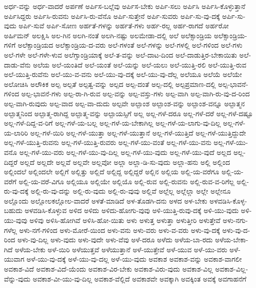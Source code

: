 {ಅರ್ಧ-ವನ್ನು
ಅರ್ಧ-ವಾದರೆ
ಅರ್ಪಣೆ
ಅರ್ಪಿಸ-ಬಲ್ಲೆವು
ಅರ್ಪಿಸ-ಬೇಕು
ಅರ್ಪಿ-ಸಲು
ಅರ್ಪಿಸಿ
ಅರ್ಪಿಸಿ-ಕೊಳ್ಳುತ್ತಾನೆ
ಅರ್ಪಿಸಿದ್ದರು
ಅರ್ಪಿಸಿ-ರುವನು
ಅರ್ಪಿಸಿ-ರು-ವೆನೊ
ಅರ್ಪಿ-ಸುತ್ತೇನೆ
ಅರ್ಪಿ-ಸುವರು
ಅರ್ಪಿ-ಸು-ವು-ದಕ್ಕೆ
ಅರ್ಪಿ-ಸು-ವುದು
ಅರ್ಪಿ-ಸುವೆ
ಅರ್ಪಿ-ಸೋಣ
ಅರ್ಹತೆ-ಗಳನ್ನು
ಅರ್ಹತೆ-ಗಳು
ಅರ್ಹ-ರಲ್ಲ
ಅರ್ಹ-ರಾಗದೆ
ಅರ್ಹರೋ
ಅರ್ಹಿಮನ್
ಅಲಕ್ಷಿಸಿ
ಅಲ-ಗಿನ
ಅಲಗಿ-ನಂತೆ
ಅಲಗಿ-ನಷ್ಟು
ಅಲಮೇಡಾ-ದಲ್ಲಿ
ಅಲೆ
ಅಲೆಕ್ಸಾಂಡ್ರಿಯ
ಅಲೆಕ್ಸಾಂಡ್ರಿಯ-ಗಳಿಗೆ
ಅಲೆಕ್ಸಾಂಡ್ರಿಯದ
ಅಲೆಕ್ಸಾಂಡ್ರಿಯ-ದ-ವರು
ಅಲೆ-ಗಳಂತೆ
ಅಲೆ-ಗಳನ್ನು
ಅಲೆ-ಗಳಲ್ಲಿ
ಅಲೆ-ಗಳಿಂದ
ಅಲೆ-ಗಳು
ಅಲೆ-ಗಳೇ
ಅಲೆ-ಗಳೇ-ಳುವ
ಅಲೆಗ್ಸಾಂಡ್ರಿಯಾಕ್ಕೆ
ಅಲೆ-ತ-ವನ್ನು
ಅಲೆ-ದಾಟ-ದಿಂದ
ಅಲೆ-ದಾಡುತ್ತಿರ-ಬೇಕಾಯಿತು
ಅಲೆ-ದಾಡು-ವೆನು
ಅಲೆಯ
ಅಲೆ-ಯಂತಿದೆ
ಅಲೆ-ಯಂತೆ
ಅಲೆ-ಯನ್ನು
ಅಲೆ-ಯಲು
ಅಲೆ-ಯುತ್ತಿ-ರಲಿ
ಅಲೆ-ಯುತ್ತಿ-ರುವ
ಅಲೆ-ಯುತ್ತಿ-ರುವೆನು
ಅಲೆ-ಯು-ವ-ವನು
ಅಲೆ-ಯು-ವು-ದಕ್ಕೆ
ಅಲೆ-ಯು-ವು-ದೆಲ್ಲ
ಅಲೆಯೂ
ಅಲೆಯೆ
ಅಲೆಯೇ
ಅಲೋಚಿಸಿ
ಅಲೌಕಿಕ
ಅಲ್ಪ
ಅಲ್ಪತೆ
ಅಲ್ಪತ್ವ-ವನ್ನು
ಅಲ್ಪದ
ಅಲ್ಪ-ದಂತೆ
ಅಲ್ಪ-ದಲ್ಲಿ
ಅಲ್ಪಪ್ರಮಾಣ-ದಲ್ಲಿ
ಅಲ್ಪ-ಭಾವನೆ-ಗಳಿಂದ
ಅಲ್ಪ-ಭಾವನೆ-ಗಳು
ಅಲ್ಪ-ರಾ-ಗಿ-ರುವ
ಅಲ್ಪ-ವನ್ನು
ಅಲ್ಪ-ವಸ್ತು-ಗಳು
ಅಲ್ಪ-ವಾಗಿ
ಅಲ್ಪ-ವಾಗಿ-ರು-ವು-ದ-ರಿಂದ
ಅಲ್ಪ-ವಾಗಿ-ರುವುದು
ಅಲ್ಪ-ವಾದ
ಅಲ್ಪ-ವಾ-ದುದು
ಅಲ್ಪವೇ
ಅಲ್ಪಾಂಶ
ಅಲ್ಪಾಂಶ-ವನ್ನು
ಅಲ್ಪಾಂಶ-ವನ್ನೂ
ಅಲ್ಪಾತ್ಮನ
ಅಲ್ಪಾತ್ಮನಿಂದ
ಅಲ್ಪಾತ್ಮ-ರಾಗಿದ್ದ
ಅಲ್ಪಾತ್ಮ-ವನ್ನು
ಅಲ್ಪಾಯಸ್ಸಿಗೆ
ಅಲ್ಲ
ಅಲ್ಲ-ಗಳೆ-ದರೂ
ಅಲ್ಲ-ಗಳೆ-ದರೆ
ಅಲ್ಲ-ಗಳೆ-ದಷ್ಟೂ
ಅಲ್ಲ-ಗಳೆ-ದಿದ್ದ-ವ-ರಿಗೆ
ಅಲ್ಲ-ಗಳೆ-ಯ-ಬಲ್ಲ
ಅಲ್ಲ-ಗಳೆ-ಯ-ಬೇಕಾಗಿಲ್ಲ
ಅಲ್ಲ-ಗಳೆ-ಯ-ಲಾಗು-ವು-ದಿಲ್ಲ
ಅಲ್ಲ-ಗಳೆ-ಯ-ಲಾರಿರಿ
ಅಲ್ಲ-ಗಳೆ-ಯಿರಿ
ಅಲ್ಲ-ಗಳೆ-ಯುತ್ತಾ
ಅಲ್ಲ-ಗಳೆ-ಯುತ್ತಾನೆ
ಅಲ್ಲ-ಗಳೆ-ಯುತ್ತಿದೆ
ಅಲ್ಲ-ಗಳೆ-ಯುತ್ತಿದ್ದುದೇ
ಅಲ್ಲ-ಗಳೆ-ಯುತ್ತಿ-ರುವನು
ಅಲ್ಲ-ಗಳೆ-ಯುತ್ತಿ-ರುವರು
ಅಲ್ಲ-ಗಳೆ-ಯು-ವಂತೆ
ಅಲ್ಲ-ಗಳೆ-ಯು-ವನು
ಅಲ್ಲ-ಗಳೆ-ಯು-ವನೊ
ಅಲ್ಲ-ಗಳೆ-ಯು-ವರು
ಅಲ್ಲ-ಗಳೆ-ಯು-ವು-ದಿಲ್ಲ
ಅಲ್ಲ-ಗಳೆ-ಯು-ವುದು
ಅಲ್ಲ-ಗಳೆ-ಯು-ವುದೆ
ಅಲ್ಲದ
ಅಲ್ಲ-ದಿದ್ದರೆ
ಅಲ್ಲದೆ
ಅಲ್ಲದೇ
ಅಲ್ಲವೆ
ಅಲ್ಲವೇ
ಅಲ್ಲವೋ
ಅಲ್ಲಾ
ಅಲ್ಲಾ-ಡಿ-ಸು-ವುದು
ಅಲ್ಲಾ-ಹನು
ಅಲ್ಲಿ
ಅಲ್ಲಿಂದ
ಅಲ್ಲಿಂದಲೆ
ಅಲ್ಲಿಂದಲೇ
ಅಲ್ಲಿಗೆ
ಅಲ್ಲಿತ್ತು
ಅಲ್ಲಿದೆ
ಅಲ್ಲಿದ್ದ
ಅಲ್ಲಿದ್ದರೆ
ಅಲ್ಲಿನ
ಅಲ್ಲಿಯ
ಅಲ್ಲಿ-ಯ-ವರೆಗೂ
ಅಲ್ಲಿ-ಯ-ವರೆಗೆ
ಅಲ್ಲಿ-ಯ-ವರೆ-ವಿಗೂ
ಅಲ್ಲಿಯೂ
ಅಲ್ಲಿಯೇ
ಅಲ್ಲಿಯೊ
ಅಲ್ಲಿ-ರುವ
ಅಲ್ಲಿ-ರುವನು
ಅಲ್ಲಿ-ರುವ-ವ-ರಿಗೆಲ್ಲ
ಅಲ್ಲಿ-ರು-ವು-ದಕ್ಕೆ
ಅಲ್ಲಿ-ರು-ವು-ದನ್ನು
ಅಲ್ಲಿ-ರು-ವುದು
ಅಲ್ಲಿ-ರು-ವುವು
ಅಲ್ಲಿವೆ
ಅಲ್ಲೆಲ್ಲ
ಅಲ್ಲೆಲ್ಲಾ
ಅಲ್ಲೇ
ಅಲ್ಲೇನೂ
ಅಲ್ಲೊಂದು
ಅಲ್ಲೋಲಕಲ್ಲೋಲ-ವಾದರೆ
ಅಳತೆ-ಮಾಡಿದೆ
ಅಳ-ತೊಡಗಿ-ದನು
ಅಳದ
ಅಳ-ಬೇಕು
ಅಳವಡಿಸಿ-ಕೊಳ್ಳ-ಬಹುದು
ಅಳವಡಿಸಿ-ಕೊಳ್ಳುವ
ಅಳಿದ
ಅಳಿದು
ಅಳಿದು-ಹೋಗು-ವುವು
ಅಳಿ-ಯುತ್ತಿ-ರುವು-ದಕ್ಕೆ
ಅಳಿ-ಯು-ವುದು
ಅಳಿ-ಯು-ವುವು
ಅಳಿವು
ಅಳಿಸಿ-ಹೋಗಿವೆ
ಅಳಿಸಿ-ಹೋ-ಯಿತು
ಅಳು
ಅಳುತ್ತ
ಅಳುತ್ತಾ
ಅಳುತ್ತೀರಿ
ಅಳುತ್ತೇವೆ
ಅಳು-ನಗು-ಗಳೆಲ್ಲ
ಅಳು-ನಗೆ-ಗಳಿಂದ
ಅಳು-ಮೋರೆ-ಯಿಂದ
ಅಳು-ವನು
ಅಳು-ವರು
ಅಳು-ವ-ವರು
ಅಳು-ವು-ದಕ್ಕೆ
ಅಳು-ವು-ದ-ರಿಂದ
ಅಳು-ವು-ದಿಲ್ಲ
ಅಳು-ವುದು
ಅಳು-ವುದೇ
ಅಳು-ವೆವು
ಅಳೆ-ದರೂ
ಅಳೆದು
ಅಳೆಯ-ಬಾ-ರದು
ಅಳೆಯ-ಬೇಕಾ-ಗಿದೆ
ಅಳೆಯ-ಬೇಕು
ಅಳೆ-ಯಿರಿ
ಅಳೆಯುತ್ತವೆ
ಅಳೆಯುತ್ತಾನೆ
ಅಳೆ-ಯುತ್ತೇವೆ
ಅಳೆ-ಯುವ
ಅಳೆ-ಯು-ವರು
ಅಳೆ-ಯುವಾಗ
ಅಳೆ-ಯು-ವು-ದಕ್ಕೆ
ಅಳೆ-ಯು-ವು-ದಲ್ಲ
ಅಳೆ-ಯು-ವುದು
ಅವಕಾಶ
ಅವಕಾಶ-ವನ್ನು
ಅವಕಾಶ-ವಾಗಲೀ
ಅವಕಾಶ-ವಿದೆ
ಅವಕಾಶ-ವಿದೆ-ಯೆಂದು
ಅವಕಾಶ-ವಿರ-ಬೇಕು
ಅವಕಾಶ-ವಿರು-ವುದು
ಅವಕಾಶ-ವಿಲ್ಲ
ಅವಕಾಶ-ವಿಲ್ಲ-ವೆನ್ನು-ವುದು
ಅವಕಾಶ-ವೀ-ಯು-ವು-ದಿಲ್ಲ
ಅವಕಾಶ-ವೆಲ್ಲಿದೆ
ಅವಕಾಶವೇ
ಅವಕ್ಕಾಗಿ
ಅವಕ್ಕಿಂತ
ಅವಕ್ಕೆ
ಅವಗಾಹನೆಗೆ
}
